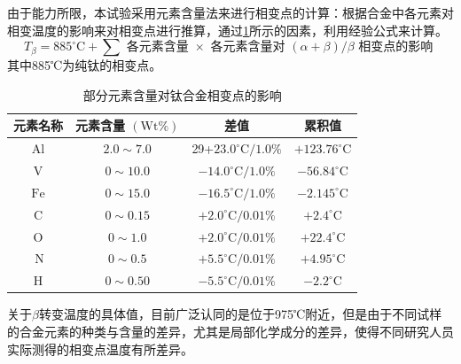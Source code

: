 由于能力所限，本试验采用元素含量法来进行相变点的计算：根据合金中各元素对相变温度的影响来对相变点进行推算，通过\ref{sec:chem4ti}所示\cite{ananyaLocationBasedIntelligent2011}的因素，利用经验公式来计算。
\begin{equation}
	T_\beta=885^{\circ} \mathrm{C}+\sum \text { 各元素含量 } \times \text { 各元素含量对 }(\alpha+\beta) / \beta \text { 相变点的影响 }
	\label{jingyan}
\end{equation}
其中885℃为纯钛的相变点。
\begin{table}[htbp]
	\centering
	\caption{部分元素含量对钛合金相变点的影响}
	\label{sec:chem4ti}
	\begin{tabular}{cccc}
		\hline 元素名称 & 元素含量 $(\mathrm{Wt} \%)$ & 差值&累积值 \\
		\hline $\mathrm{Al}$ & $2.0 \sim 7.0$ & 29+$23.0^{\circ} \mathrm{C} / 1.0 \%$ & $+123.76^{\circ} \mathrm{C}$ \\
		$\mathrm{V}$ & $0 \sim 10.0$ & $-14.0^{\circ} \mathrm{C} / 1.0 \%$ & $-56.84^{\circ} \mathrm{C}$ \\
		$\mathrm{Fe}$ & $0 \sim 15.0$ & $-16.5^{\circ} \mathrm{C} / 1.0 \%$ & $-2.145^{\circ} \mathrm{C}$
		 \\
		$\mathrm{C}$ & $0 \sim 0.15$ & $+2.0^{\circ} \mathrm{C} / 0.01 \%$ &$ +2.4^{\circ} \mathrm{C} $\\
		$\mathrm{O}$ & $0 \sim 1.0$ & $+2.0^{\circ} \mathrm{C} / 0.01 \%$& $ +22.4^{\circ} \mathrm{C} $\\
		$\mathrm{~N}$ & $0 \sim 0.5$ & $+5.5^{\circ} \mathrm{C} / 0.01 \%$& $ +4.95^{\circ} \mathrm{C} $\\
		$\mathrm{H}$ & $0 \sim 0.50$ & $-5.5^{\circ} \mathrm{C} / 0.01 \%$ &$ -2.2^{\circ} \mathrm{C} $\\
		\hline
	\end{tabular}
\end{table}


关于$\beta$转变温度的具体值，目前广泛认同的是位于975℃附近，但是由于不同试样的合金元素的种类与含量的差异，尤其是局部化学成分的差异，使得不同研究人员实际测得的相变点温度有所差异\cite{wangtaoTC4hejinxiangbianwendujiancezhongjieguobuyizhiyuanyinfenxi2013}。

